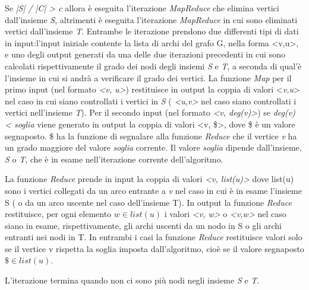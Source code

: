 \documentclass[LaM,binding=0.6cm]{sapthesis}
\begin{document}
Se \textit{|S| / |C| > c} allora è eseguita l'iterazione \textit{MapReduce} che elimina vertici dall'insieme \textit{S}, altrimenti è eseguita l'iterazione \textit{MapReduce} in cui sono eliminati vertici dall'insieme \textit{T}. Entrambe le iterazione prendono due differenti tipi di dati in input:l'input iniziale contente la lista di archi del grafo G, nella forma <v,u>, e uno degli output generati da una delle due iterazioni precedenti in cui sono calcolati rispettivamente il grado dei nodi degli insiemi \textit{S} e \textit{T}, a seconda di qual'è l'insieme in cui si andrà a verificare il grado dei vertici.
La funzione \textit{Map} per il primo input (nel formato \textit{<v, u>}) restituisce in output la coppia di valori <\textit{v,u}> nel caso in cui siano controllati i vertici in \textit{S} ( \textit{<u,v>} nel caso siano controllati i vertici nell'insieme \textit{T}). 
Per il secondo  input (nel formato \textit{<v, deg(v)>}) se \textit{deg(v) < soglia} viene generato in output la coppia di valori <v, \$>, dove \$ è un valore segnaposto. \$ ha la funzione di segnalare alla funzione \textit{Reduce} che il vertice \textit{v} ha un grado maggiore del valore \textit{soglia} corrente. Il valore \textit{soglia} dipende dall'insieme, \textit{S} o \textit{T}, che è in esame nell'iterazione corrente dell'algoritmo.

La funzione \textit{Reduce} prende in input la coppia di valori \textit{<v, list(u)>} dove list(u) sono i vertici collegati da un arco entrante a \textit{v} nel caso in cui è in esame l'insieme S ( o da un arco uscente nel caso dell'insieme T).
In output la funzione \textit{Reduce} restituisce, per ogni elemento \textit{$w \in list(u)$} i valori \textit{<v, w>} o \textit{<v,w>} nel caso siano in esame, rispettivamente, gli archi uscenti da un nodo in S o gli archi entranti nei nodi in T. In entrambi i casi la funzione \textit{Reduce} restituisce valori solo se il vertice v rispetta la soglia imposta dall'algoritmo, cioè se il valore segnaposto \textit{$\$ \in list(u) $}.

L'iterazione termina quando non ci sono più nodi negli insieme \textit{S} e \textit{T}.


\begin{minipage}{\linewidth}

\end{minipage}
\begin{minipage}{\linewidth}

\end{minipage}
\end{document}

